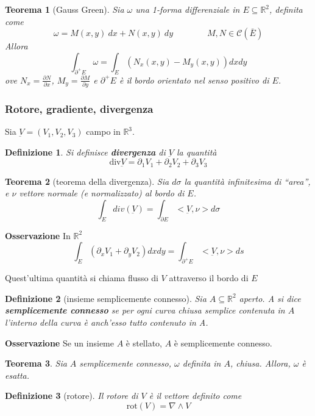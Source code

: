 \documentclass[a4paper,12pt]{article}
\newcommand{\cont}{\mathscr{C}}
\newtheorem{teo}{Teorema}
\newtheorem{defi}{Definizione}
\begin{document}
\begin{teo}[Gauss Green]
Sia $\omega$ una 1-forma differenziale in $E\subseteq\mathbb{R}^2$, definita come
$$\omega=M(x,y)\ dx+N(x,y)\ dy\qquad\qquad M,N\in\cont(\bar E)$$
Allora
$$\int_{\partial^+E}\omega = \int_{E} \left( N_x(x,y)-M_y(x,y) \right)dxdy$$
ove $N_x = \frac{\partial N}{\partial x}$, $M_y = \frac{\partial M}{\partial y}$ e $\partial^+E$ è il bordo orientato nel senso positivo di $E$.
\end{teo}

\subsubsection{Rotore, gradiente, divergenza}

Sia $\underbar{V}=(V_1, V_2, V_3)$ campo in $\mathbb{R}^3$.
\begin{defi}
Si definisce \textbf{divergenza} di $\underbar{V}$ la quantità
$$\text{div}\underbar{V}= \partial_1V_1 + \partial_2V_2 + \partial_3V_3$$
\end{defi}

\begin{teo}[teorema della divergenza]
Sia $d\sigma$ la quantità infinitesima di ``area'', e $\nu$ vettore normale (e normalizzato) al bordo di $E$.
$$\int_E div(\underbar{V}) = \int_{\partial E} <\underbar{V},\nu> d\sigma$$
\end{teo}
\textbf{Osservazione}
In $\mathbb{R}^2$
$$\int_E (\partial_xV_1 + \partial_yV_2)dxdy = \int_{\partial^+ E} <\underbar{V},\nu> ds$$

Quest'ultima quantità si chiama flusso di $V$ attraverso il bordo di $E$


\begin{defi}[insieme semplicemente connesso]
Sia $A\subseteq\mathbb{R}^2$ aperto. A si dice \textbf{semplicemente connesso} se per ogni curva chiusa semplice contenuta in $A$ l'interno della curva è anch'esso tutto contenuto in A.
\end{defi}

\textbf{Osservazione}
Se un insieme $A$ è stellato, $A$ è semplicemente connesso.

\begin{teo}
 Sia $A$ semplicemente connesso, $\omega$ definita in $A$, chiusa.
 Allora, $\omega$ è esatta.
\end{teo}

\begin{defi}[rotore]
 Il rotore di $V$ è il vettore definito come
 $$\text{rot}(V) = \nabla\wedge V$$
\end{defi}
\end{document}
